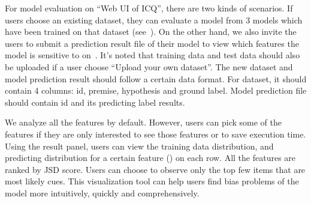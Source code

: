 
 For model evaluation on ``Web UI of ICQ'', there are two kinds of scenarios. If users choose an existing dataset, 
they can evaluate a model from 3 models which have been trained on that dataset (see~). 
On the other hand, we also invite the users to 
submit a prediction result file of their model to view which features the 
model is sensitive to on~. It's noted that training data and test data should also be uploaded 
if a user choose ``Upload your own dataset''. The new dataset and model prediction result should follow a certain data format. For dataset, it should contain 4 columns: id, premise, hypothesis and ground label. Model prediction file should contain id and its predicting label results.

We analyze all the features by default. However, users can pick some of the features 
if they are only interested to see those features or to save execution time.
Using the result panel, users can view the training data distribution,  
and predicting distribution for a certain feature () on each row. 
All the features are ranked by JSD score. Users can choose to observe 
only the top few items that are most likely cues. This visualization tool can help users 
find bias problems of the model more intuitively, quickly and comprehensively.  

